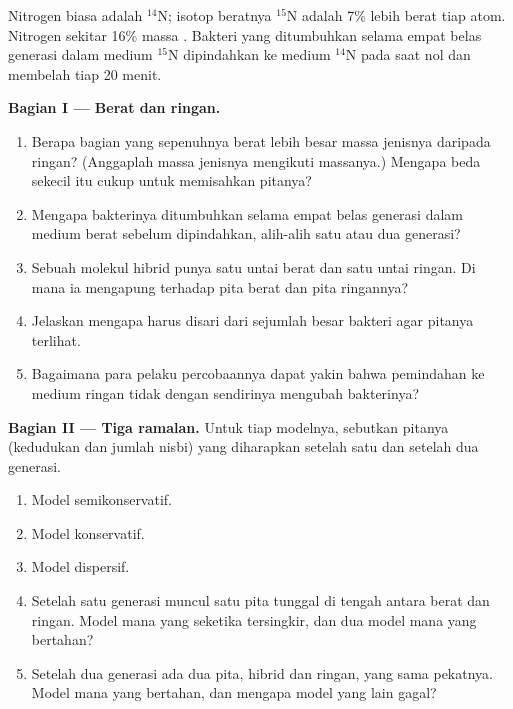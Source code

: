 \begin{problem}
\label{pb:g11:dna-replication:1}
Nitrogen biasa adalah $^{14}$N; isotop beratnya $^{15}$N adalah 7\%
lebih berat tiap atom. Nitrogen sekitar 16\% massa . Bakteri yang
ditumbuhkan selama empat belas generasi dalam medium $^{15}$N
dipindahkan ke medium $^{14}$N pada saat nol dan membelah tiap 20 menit.

\medskip
\noindent\textbf{Bagian I --- Berat dan ringan.}
\begin{enumerate}
  \item Berapa bagian  yang sepenuhnya berat lebih besar massa
        jenisnya daripada  ringan? (Anggaplah massa jenisnya
        mengikuti massanya.) Mengapa beda sekecil itu cukup untuk
        memisahkan pitanya?
  \item Mengapa bakterinya ditumbuhkan selama empat belas generasi
        dalam medium berat sebelum dipindahkan, alih-alih satu atau dua
        generasi?
  \item Sebuah molekul hibrid punya satu untai berat dan satu untai
        ringan. Di mana ia mengapung terhadap pita berat dan pita ringannya?
  \item Jelaskan mengapa  harus disari dari sejumlah besar
        bakteri agar pitanya terlihat.
  \item Bagaimana para pelaku percobaannya dapat yakin bahwa
        pemindahan ke medium ringan tidak dengan sendirinya mengubah
         bakterinya?
\end{enumerate}

\medskip
\noindent\textbf{Bagian II --- Tiga ramalan.}
Untuk tiap modelnya, sebutkan pitanya (kedudukan dan jumlah nisbi) yang
diharapkan setelah satu dan setelah dua generasi.
\begin{enumerate}[resume]
  \item Model semikonservatif.
  \item Model konservatif.
  \item Model dispersif.
  \item Setelah satu generasi muncul satu pita tunggal di tengah antara
        berat dan ringan. Model mana yang seketika tersingkir, dan dua
        model mana yang bertahan?
  \item Setelah dua generasi ada dua pita, hibrid dan ringan, yang sama
        pekatnya. Model mana yang bertahan, dan mengapa model yang lain
        gagal?
\end{enumerate}


\end{problem}
